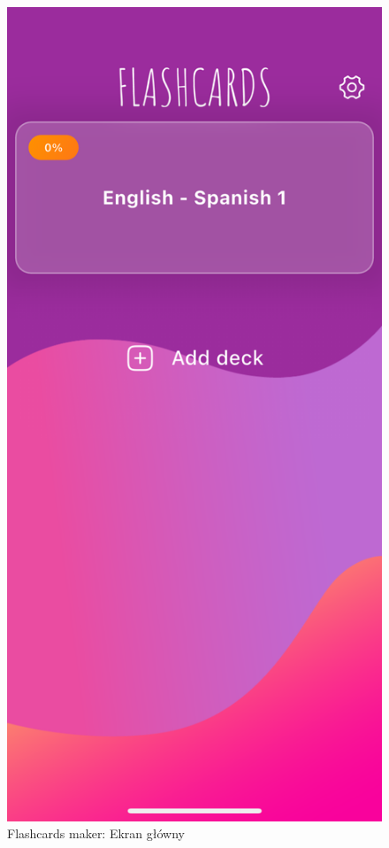 \documentclass[final,a4paper,openany,12pt]{mwbk}
\begin{document}
\begin{figure}[H]
\centering
\begin{minipage}{0.5\textwidth}
  \centering
\includegraphics[width=.75\linewidth]{img/flashcards_maker1.PNG}
  \caption{Flashcards maker: Ekran główny}
  \label{fig:flashcards_maker1}
\end{minipage}%
\begin{minipage}{0.5\textwidth}
  \centering

\end{minipage}
\end{figure}
\end{document}
